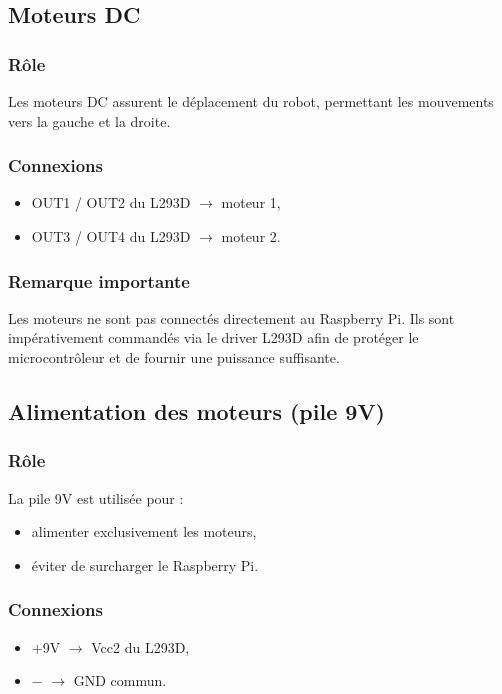 
\subsection{Moteurs DC}

\subsubsection{Rôle}
Les moteurs DC assurent le déplacement du robot, permettant les mouvements vers la gauche et la droite.

\subsubsection{Connexions}
\begin{itemize}
    \item OUT1 / OUT2 du L293D $\rightarrow$ moteur 1,
    \item OUT3 / OUT4 du L293D $\rightarrow$ moteur 2.
\end{itemize}

\subsubsection{Remarque importante}
Les moteurs ne sont pas connectés directement au Raspberry Pi. Ils sont impérativement commandés via le driver L293D afin de protéger le microcontrôleur et de fournir une puissance suffisante.


\subsection{Alimentation des moteurs (pile 9V)}

\subsubsection{Rôle}
La pile 9V est utilisée pour :
\begin{itemize}
    \item alimenter exclusivement les moteurs,
    \item éviter de surcharger le Raspberry Pi.
\end{itemize}

\subsubsection{Connexions}
\begin{itemize}
    \item +9V $\rightarrow$ Vcc2 du L293D,
    \item $-$ $\rightarrow$ GND commun.
\end{itemize}

